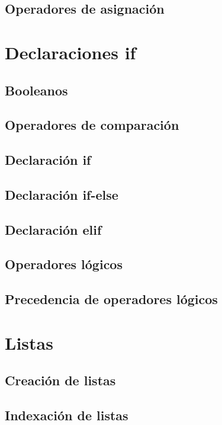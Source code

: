 \documentclass{article}
\begin{document}
\subsection{Operadores de asignación}

\section{Declaraciones if}

\subsection{Booleanos}

\subsection{Operadores de comparación}

\subsection{Declaración if}

\subsection{Declaración if-else}

\subsection{Declaración elif}

\subsection{Operadores lógicos}

\subsection{Precedencia de operadores lógicos}

\section{Listas}

\subsection{Creación de listas}

\subsection{Indexación de listas}
\end{document}
